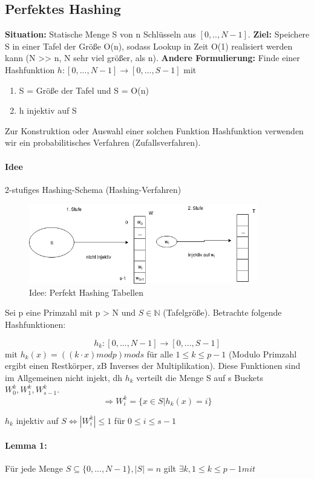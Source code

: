 \documentclass[ngerman]{scrartcl}
\begin{document}
\subsection{Perfektes Hashing}
\textbf{Situation:} Statische Menge  S von n Schlüsseln aus $ [0,..,N-1] $. \textbf{Ziel:} Speichere S in einer Tafel der Größe O(n), sodass Lookup in Zeit O(1) realisiert werden kann (N >> n, N sehr viel größer, als n). \textbf{Andere Formulierung:} Finde einer Hashfunktion $ h: [0,..., N-1] \rightarrow [0,...,S-1] $ mit 
\begin{enumerate}
    \item S = Größe der Tafel und S = O(n)
    \item h injektiv auf S
\end{enumerate}
Zur Konstruktion oder Auswahl einer solchen Funktion Hashfunktion verwenden wir ein probabilitisches Verfahren (Zufallsverfahren).
\paragraph{Idee} 2-stufiges Hashing-Schema (Hashing-Verfahren)
\begin{figure}[h]
    \begin{center}
        \includegraphics[width=10cm]{perfekthashing.png}
        \caption{Idee: Perfekt Hashing Tabellen}
        \label{fig:}
    \end{center}
\end{figure}

Sei p eine Primzahl mit p > N und $ S \in \mathbb{N} $ (Tafelgröße). Betrachte folgende Hashfunktionen:

$$ h_k:[0,...,N-1] \rightarrow [0,...,S-1] $$ mit $ h_k(x)= ((k \cdot x) mod p) mod s  $ für alle $ 1 \leq k \leq p-1 $ (Modulo Primzahl ergibt einen Restkörper, zB Inverses der Multiplikation). Diese Funktionen sind im Allgemeinen nicht injekt, dh $ h_k $ verteilt die Menge S auf s Buckets $ W_0^k, W_1^k, W_{s-1}^k $. 
$$ \Rightarrow W_i^k  = \{x\in S | h_k(x) = i\} $$

$ h_k $ injektiv auf $ S \Leftrightarrow |W_i^k| \leq 1 $ für $ 0 \leq i \leq s-1 $

\paragraph{Lemma 1: } Für jede Menge $ S \subseteq \{0,..., N-1 \}, |S| = n $ gilt $ \exists k, 1 \leq k \leq p-1 mit $
\end{document}
